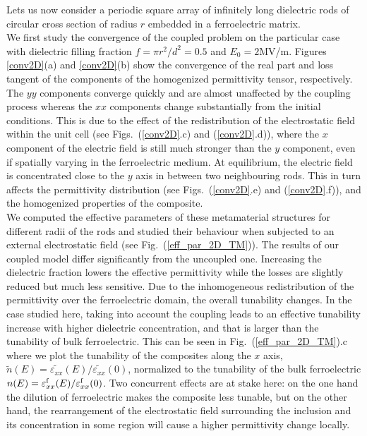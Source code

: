 \documentclass[%
 aip,
 amsmath,amssymb,
 reprint,%
]{revtex4-1}
\newcommand{\epsf}{\varepsilon^{\rm f}}
\newcommand{\fig}[1]{Fig.~(\ref{#1})}
\newcommand{\co}[1]{#1}
\begin{document}
Lets us now consider a periodic square array of infinitely long dielectric rods of circular cross section
of radius $r$ embedded in a ferroelectric matrix.\\
We first study the convergence of the coupled problem on the particular case with dielectric
filling fraction $f=\pi r^2/d^2=0.5$ and $E_0=2$MV/m. Figures \ref{conv2D}(a) and \ref{conv2D}(b) show the
convergence of the real part and loss tangent of the components of the homogenized
permittivity tensor, respectively. The $yy$ components converge quickly
and are almost unaffected by the coupling process whereas the
$xx$ components change substantially from the initial conditions.
This is due to the effect of the redistribution
of the electrostatic field within the unit cell (see Figs.~(\ref{conv2D}.c) and (\ref{conv2D}.d)),
where the $x$ component of the electric field is still much stronger
than the $y$ component, even if spatially varying in the ferroelectric medium.
At equilibrium, the electric field is concentrated close to the $y$ axis in between two neighbouring
rods. This in turn affects the permittivity distribution (see Figs.~(\ref{conv2D}.e) and (\ref{conv2D}.f)),
and the homogenized properties of the composite.\\
We computed the effective parameters of these metamaterial structures for different
radii of the rods and studied their behaviour when subjected to an external
electrostatic field (see \fig{eff_par_2D_TM}). The results of our coupled
model differ significantly from the uncoupled one. Increasing the dielectric fraction
lowers the effective permittivity while the losses are slightly reduced but much less sensitive.
Due to the inhomogeneous redistribution of the permittivity over the ferroelectric domain, the
overall tunability changes. In the case studied here, taking into account
the coupling leads to an effective tunability increase with
higher dielectric concentration, and that is larger than the tunability
 of bulk ferroelectric. \co{This can be seen in \fig{eff_par_2D_TM}.c where we plot the tunability of the composites
 along the $x$ axis, $\tilde{n}(E) = \tilde{\varepsilon_{xx}}(E) / \tilde{\varepsilon_{xx}}(0)$, normalized to the tunability of the bulk ferroelectric $n(E) = \epsf_{xx}(E) / \epsf_{xx}(0)$.}
 Two concurrent effects are at stake here: on the one hand
the dilution of ferroelectric makes the composite less tunable, but on the other hand,
the rearrangement of the electrostatic field surrounding the inclusion and its
concentration in some region will cause a higher permittivity change locally.
\end{document}
